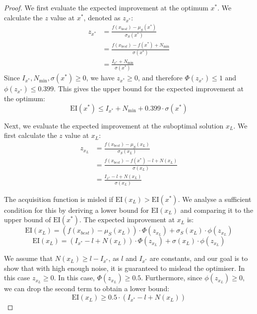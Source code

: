 \begin{proof}
We first evaluate the expected improvement at the optimum $x^*$. We calculate the $z$ value at $x^*$, denoted as $z_{x^*}$:
\begin{equation}
  \label{eq:ch08:z_xstar}
  \begin{aligned}
    z_{x^*} &= \frac{f(x_{best}) - \mu_S(x^*)}{\sigma_S(x^*)}
    \\
    &= \frac{f(x_{best}) - f(x^*)+ N_{\min}}{\sigma(x^*)}
    \\
    &= \frac{I_{x^*} + N_{\min}}{\sigma(x^*)}
  \end{aligned}
\end{equation}
Since $I_{x^*},N_{\min},\sigma(x^*) \ge 0$, we have $z_{x^*} \ge 0$, and therefore $\Phi(z_{x^*}) \le 1$ and $\phi(z_{x^*}) \le 0.399$. This gives the upper bound for the expected improvement at the optimum:
\begin{equation}
    \label{eq:ch08:EI_star_bound}
    \mathrm{EI}(x^*) \le I_{x^*} + N_{\min} + 0.399 \cdot \sigma(x^*)
\end{equation}

Next, we evaluate the expected improvement at the suboptimal solution $x_L$. We first calculate the $z$ value at $x_L$:
\begin{equation}
  \label{eq:ch08:z_xl}
  \begin{aligned}
    z_{x_L} &= \frac{f(x_{best}) - \mu_S(x_L)}{\sigma_S(x_L)}
    \\
    &= \frac{f(x_{best}) - f(x^*) - l + N(x_L)}{\sigma(x_L)}
    \\
    &= \frac{I_{x^*}-l+N(x_L)}{\sigma(x_L)}
  \end{aligned}
\end{equation}

The acquisition function is misled if $\mathrm{EI}(x_L) > \mathrm{EI}(x^*)$. We analyse a sufficient condition for this by deriving a lower bound for $\mathrm{EI}(x_L)$ and comparing it to the upper bound of $\mathrm{EI}(x^*)$. The expected improvement at $x_L$ is:
\begin{equation*}
    \mathrm{EI}(x_L) = (f(x_{best}) - \mu_S(x_L)) \cdot \Phi(z_{x_L}) + \sigma_S(x_L) \cdot \phi(z_{x_L})
\end{equation*}
\begin{equation*}
    \mathrm{EI}(x_L) = (I_{x^*} - l + N(x_L)) \cdot \Phi(z_{x_L}) + \sigma(x_L) \cdot \phi(z_{x_L})
\end{equation*}

We assume that $N(x_L) \ge l - I_{x^*}$, as $l$ and $I_{x^*}$ are constants, and our goal is to show that with high enough noise, it is guaranteed to mislead the optimiser.
In this case $z_{x_L} \ge 0$. In this case, $\Phi(z_{x_L}) \ge 0.5$. Furthermore, since $\phi(z_{x_L}) \ge 0$, we can drop the second term to obtain a lower bound:
\begin{equation}
    \label{eq:ch08:ei_xl}
    \mathrm{EI}(x_L) \ge 0.5 \cdot (I_{x^*} - l + N(x_L))
\end{equation}


\end{proof}
